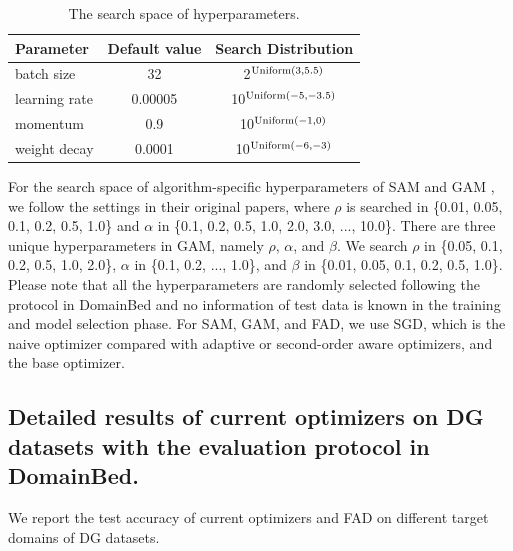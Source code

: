 \begin{table}[th]
\centering
\caption{The search space of hyperparameters.}
\begin{tabular}{l|cc}
\toprule
Parameter & Default value & Search Distribution \\
\midrule
batch size & 32 & 2$^{\rm Uniform(3, 5.5)}$ \\
learning rate & 0.00005 & 10$^{\rm Uniform(-5, -3.5)}$ \\
momentum & 0.9 & 10$^{\rm Uniform(-1, 0)}$ \\
weight decay & 0.0001 & 10$^{\rm Uniform(-6, -3)}$ \\
\bottomrule
\end{tabular}
\label{tab:hyper_space}
\end{table}

For the search space of algorithm-specific hyperparameters of SAM \cite{du2021efficient} and GAM \cite{Zhang2023GradientNA}, we follow the settings in their original papers, where $\rho$ is searched in \{0.01, 0.05, 0.1, 0.2, 0.5, 1.0\} and $\alpha$ in \{0.1, 0.2, 0.5, 1.0, 2.0, 3.0, ..., 10.0\}. There are three unique hyperparameters in GAM, namely $\rho$, $\alpha$, and $\beta$. We search $\rho$ in \{0.05, 0.1, 0.2, 0.5, 1.0, 2.0\}, $\alpha$ in \{0.1, 0.2, ..., 1.0\}, and $\beta$ in \{0.01, 0.05, 0.1, 0.2, 0.5, 1.0\}. Please note that all the hyperparameters are randomly selected following the protocol in DomainBed and no information of test data is known in the training and model selection phase. For SAM, GAM, and FAD, we use SGD, which is the naive optimizer compared with adaptive or second-order aware optimizers, and the base optimizer.      

\subsection{Detailed results of current optimizers on DG datasets with the evaluation protocol in DomainBed.}
\label{sec:results_of_opts}
We report the test accuracy of current optimizers and FAD on different target domains of DG datasets.  

